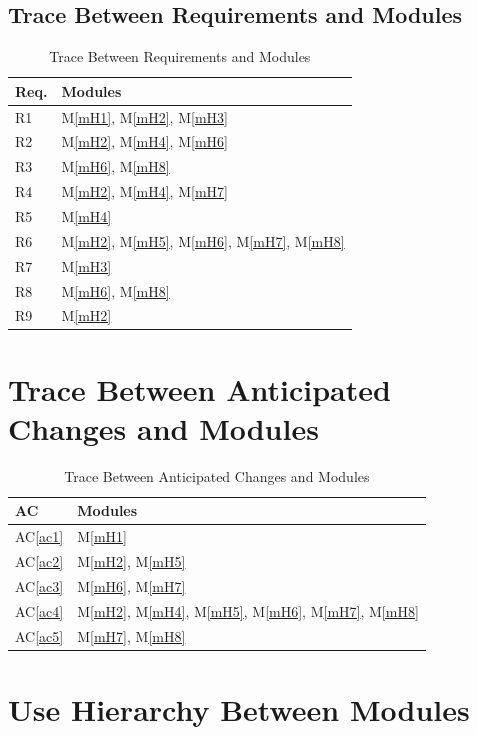 \documentclass[12pt, titlepage]{article}
\newcommand{\acref}[1]{AC\ref{#1}}
\newcommand{\mref}[1]{M\ref{#1}}
\begin{document}
\subsection*{Trace Between Requirements and Modules}
\begin{table}[H]
\centering
\begin{tabular}{p{} p{}}
\toprule
\textbf{Req.} & \textbf{Modules}\\
\midrule
R1 & \mref{mH1}, \mref{mH2}, \mref{mH3}\\
R2 & \mref{mH2}, \mref{mH4}, \mref{mH6}\\
R3 & \mref{mH6}, \mref{mH8}\\
R4 & \mref{mH2}, \mref{mH4}, \mref{mH7}\\
R5 & \mref{mH4}\\
R6 & \mref{mH2}, \mref{mH5}, \mref{mH6}, \mref{mH7}, \mref{mH8}\\
R7 & \mref{mH3}\\
R8 & \mref{mH6}, \mref{mH8}\\
R9 & \mref{mH2}\\
\bottomrule
\end{tabular}
\caption{Trace Between Requirements and Modules}
\label{TblRT}
\end{table}
\section{Trace Between Anticipated Changes and Modules}

\begin{table}[H]
\centering
\begin{tabular}{p{} p{}}
\toprule
\textbf{AC} & \textbf{Modules}\\
\midrule
\acref{ac1} & \mref{mH1}\\
\acref{ac2} & \mref{mH2}, \mref{mH5}\\
\acref{ac3} & \mref{mH6}, \mref{mH7}\\
\acref{ac4} & \mref{mH2}, \mref{mH4}, \mref{mH5}, \mref{mH6}, \mref{mH7}, \mref{mH8}\\
\acref{ac5} & \mref{mH7}, \mref{mH8}\\
\bottomrule
\end{tabular}
\caption{Trace Between Anticipated Changes and Modules}
\label{TblACT}
\end{table}

\section{Use Hierarchy Between Modules} \label{SecUse}
\end{document}
